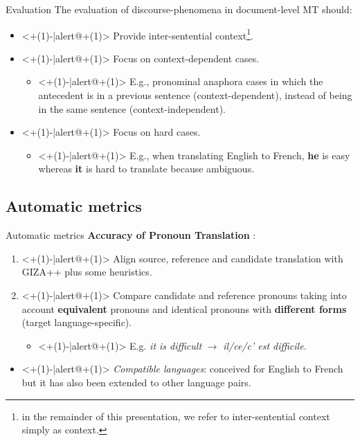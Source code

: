 \begin{frame}{Evaluation}
	The evaluation of discourse-phenomena in document-level MT should:
	\begin{itemize}
		\item<+(1)-|alert@+(1)> Provide inter-sentential context\footnote{in the remainder of this presentation, we refer to inter-sentential context simply as context.}.
		\item<+(1)-|alert@+(1)> Focus on context-dependent cases.
		\begin{itemize}
			\item<+(1)-|alert@+(1)> E.g., pronominal anaphora cases in which the antecedent is in a previous sentence (context-dependent), instead of being in the same sentence (context-independent).
		\end{itemize}
		\item<+(1)-|alert@+(1)> Focus on hard cases.
			\begin{itemize}
				\item<+(1)-|alert@+(1)> E.g., when translating English to French, \textbf{he} is easy whereas \textbf{it} is hard to translate because ambiguous.
			\end{itemize}
	\end{itemize} 
\end{frame}


\subsection{Automatic metrics}

\begin{frame}{Automatic metrics}
	\textbf{Accuracy of Pronoun Translation} \cite{miculicich_werlen_validation_2017}:
	\begin{enumerate}
		\item<+(1)-|alert@+(1)> Align source, reference and candidate translation with GIZA++ plus some heuristics.
		\item<+(1)-|alert@+(1)> Compare candidate and reference pronouns taking into account \textbf{equivalent} pronouns and identical pronouns with \textbf{different forms} (target language-specific).
		\begin{itemize}
			\item<+(1)-|alert@+(1)> E.g. \textit{it is difficult} $\rightarrow$ \textit{il/ce/c' est difficile}. 
		\end{itemize}
	\end{enumerate}
	\begin{itemize}
		\item<+(1)-|alert@+(1)> \textit{Compatible languages}: conceived for English to French but it has also been extended to other language pairs. \\
	\end{itemize}
\end{frame}

